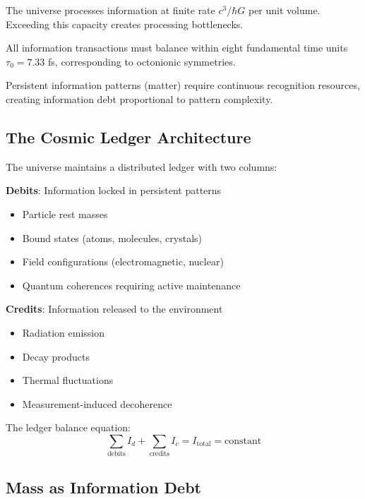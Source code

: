 \documentclass[12pt]{article}
\begin{document}
\begin{axiom}
The universe processes information at finite rate $c^3/\hbar G$ per unit volume. Exceeding this capacity creates processing bottlenecks.
\end{axiom}

\begin{axiom}
All information transactions must balance within eight fundamental time units $\tau_0 = 7.33$ fs, corresponding to octonionic symmetries.
\end{axiom}

\begin{axiom}
Persistent information patterns (matter) require continuous recognition resources, creating information debt proportional to pattern complexity.
\end{axiom}

\subsection{The Cosmic Ledger Architecture}

The universe maintains a distributed ledger with two columns:

\textbf{Debits}: Information locked in persistent patterns
\begin{itemize}
\item Particle rest masses
\item Bound states (atoms, molecules, crystals)
\item Field configurations (electromagnetic, nuclear)
\item Quantum coherences requiring active maintenance
\end{itemize}

\textbf{Credits}: Information released to the environment
\begin{itemize}
\item Radiation emission
\item Decay products
\item Thermal fluctuations
\item Measurement-induced decoherence
\end{itemize}

The ledger balance equation:
\begin{equation}
\sum_{\text{debits}} I_d + \sum_{\text{credits}} I_c = I_{\text{total}} = \text{constant}
\end{equation}

\subsection{Mass as Information Debt}
\end{document}
